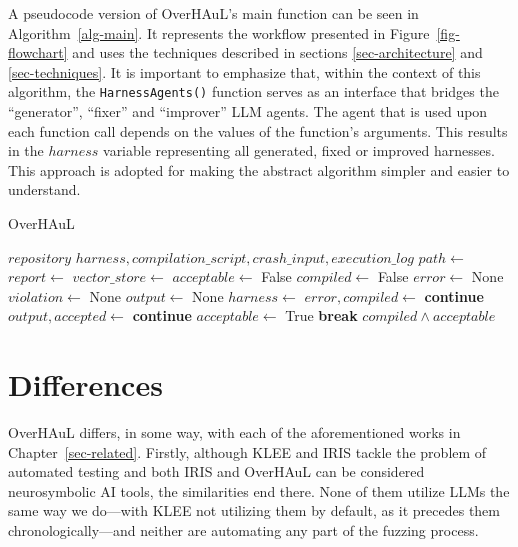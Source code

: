 \documentclass[
  a4paper,
]{scrreprt}
\theoremstyle{definition}
\theoremstyle{remark}
\begin{document}
A pseudocode version of OverHAuL's main function can be seen in
Algorithm~\ref{alg-main}. It represents the workflow presented in
Figure~\ref{fig-flowchart} and uses the techniques described in sections
\ref{sec-architecture} and \ref{sec-techniques}. It is important to
emphasize that, within the context of this algorithm, the
\texttt{HarnessAgents()} function serves as an interface that bridges
the ``generator'', ``fixer'' and ``improver'' LLM agents. The agent that
is used upon each function call depends on the values of the function's
arguments. This results in the \(harness\) variable representing all
generated, fixed or improved harnesses. This approach is adopted for
making the abstract algorithm simpler and easier to understand.

\begin{algorithm}[H]
\caption{OverHAuL}
\label{alg-main}
\begin{algorithmic}[1]
\Require $repository$
\Ensure $harness, compilation\_script, crash\_input, execution\_log$
  \State $path \gets$ 
  \State $report \gets$ 
  \State $vector\_store \gets$ 
  \State $acceptable \gets$ False
  \State $compiled \gets$ False
  \State $error \gets$ None
  \State $violation \gets$ None
  \State $output \gets$ None
    \State $harness \gets$ 
    \State $error, compiled \gets$ 
      \State \textbf{continue} 
    \EndIf
    \State $output, accepted \gets $
      \State \textbf{continue} 
    \Else
      \State $acceptable \gets$ True
      \State \textbf{break}
    \EndIf
  \EndFor
  \State \Return $compiled \land acceptable$
\end{algorithmic}
\end{algorithm}

\section{Differences}\label{sec-differences}

OverHAuL differs, in some way, with each of the aforementioned works in
Chapter~\ref{sec-related}. Firstly, although KLEE and IRIS
\autocite{iris,klee} tackle the problem of automated testing and both
IRIS and OverHAuL can be considered neurosymbolic AI tools, the
similarities end there. None of them utilize LLMs the same way we
do---with KLEE not utilizing them by default, as it precedes them
chronologically---and neither are automating any part of the fuzzing
process.
\end{document}
